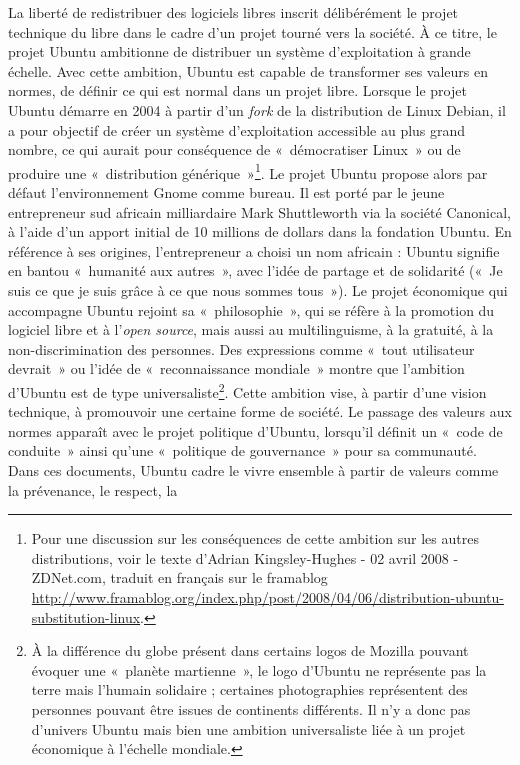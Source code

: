 \documentclass{FramateX}
\begin{document}
\begin{refsection}
La liberté de redistribuer des logiciels libres inscrit délibérément le
projet technique du libre dans le cadre d'un projet tourné vers la
société. À ce titre, le projet Ubuntu ambitionne de distribuer un
système d'exploitation à grande échelle. Avec cette ambition, Ubuntu
est capable de transformer ses valeurs en normes, de définir ce qui est
normal dans un projet libre. Lorsque le projet Ubuntu démarre en 2004 à
partir d'un \textit{fork} de la distribution de Linux Debian, il a pour
objectif de créer un système d'exploitation accessible au plus grand
nombre, ce qui aurait pour conséquence de «~démocratiser Linux~» ou de
produire une «~distribution
générique~»\footnote{Pour une discussion sur les conséquences de cette ambition sur les autres distributions, voir le texte d'Adrian Kingsley-Hughes - 02 avril 2008 - ZDNet.com, traduit en français sur le framablog \url{http://www.framablog.org/index.php/post/2008/04/06/distribution-ubuntu-substitution-linux}.}. Le projet Ubuntu propose alors par défaut l'environnement Gnome
comme bureau. Il est porté par le jeune entrepreneur sud africain
milliardaire Mark Shuttleworth via la société Canonical, à l'aide d'un
apport initial de 10 millions de dollars dans la fondation Ubuntu. En
référence à ses origines, l'entrepreneur a choisi un nom africain :
Ubuntu signifie en bantou «~humanité aux autres~», avec l'idée de
partage et de solidarité («~Je suis ce que je suis grâce à ce que nous
sommes tous~»). Le projet économique qui accompagne Ubuntu rejoint sa
«~philosophie~», qui se réfère à la promotion du logiciel libre et à
l'\textit{open source}, mais aussi au multilinguisme, à la gratuité, à la
non-discrimination des personnes. Des expressions comme «~tout
utilisateur devrait~» ou l'idée de «~reconnaissance mondiale~» montre
que l'ambition d'Ubuntu est de type
universaliste\footnote{À la différence du globe
présent dans certains logos de Mozilla pouvant évoquer une «~planète
martienne~», le logo d'Ubuntu ne représente pas la terre mais l'humain
solidaire ; certaines photographies représentent des personnes pouvant
être issues de continents différents. Il n'y a donc pas d'univers
Ubuntu mais bien une ambition universaliste liée à un projet économique
à l'échelle mondiale.}. Cette ambition vise, à partir d'une vision
technique, à promouvoir une certaine forme de société. Le passage des
valeurs aux normes apparaît avec le projet politique d'Ubuntu,
lorsqu'il définit un «~code de conduite~» ainsi qu'une «~politique de
gouvernance~» pour sa communauté. Dans ces documents, Ubuntu cadre le
vivre ensemble à partir de valeurs comme la prévenance, le respect, la

\end{refsection}
\end{document}
